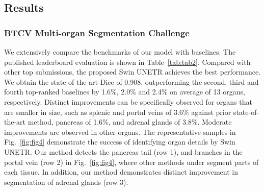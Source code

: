\documentclass[10pt,twocolumn,letterpaper]{article}
\begin{document}
\subsection{Results}
\subsubsection{BTCV Multi-organ Segmentation Challenge}
We extensively compare the benchmarks of our model with baselines. The published leaderboard evaluation is shown in Table~\ref{tab:tab2}. Compared with other top submissions, the proposed Swin UNETR achieves the best performance. We obtain the state-of-the-art Dice of 0.908, outperforming the second, third and fourth top-ranked baselines by 1.6\%, 2.0\% and 2.4\% on average of 13 organs, respectively. Distinct improvements can be specifically observed for organs that are smaller in size, such as splenic and portal veins of 3.6\%  against prior state-of-the-art method, pancreas of 1.6\%, and adrenal glands of 3.8\%. Moderate improvements are observed in other organs. The representative samples in Fig.~\ref{fig:fig4} demonstrate the success of identifying organ details by Swin UNETR. Our method detects the pancreas tail (row 1), and branches in the portal vein (row 2) in  Fig.~\ref{fig:fig4}, where other methods under segment parts of each tissue. In addition, our method demonstrates distinct improvement in segmentation of adrenal glands (row 3).
\end{document}
